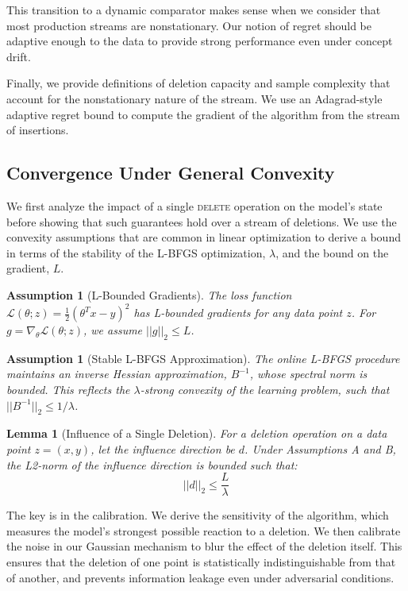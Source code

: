 \documentclass[a4paper,12pt]{article}
\newtheorem{lemma}[theorem]{Lemma}
\newtheorem{assumption}[theorem]{Assumption}
\begin{document}
This transition to a dynamic comparator makes sense when we consider that most production streams are nonstationary. Our notion of regret should be adaptive enough to the data to provide strong performance even under concept drift.

Finally, we provide definitions of deletion capacity and sample complexity that account for the nonstationary nature of the stream. We use an Adagrad-style adaptive regret bound to compute the gradient of the algorithm from the stream of insertions.

\subsection{Convergence Under General Convexity}

We first analyze the impact of a single \textsc{delete} operation on the model's state before showing that such guarantees hold over a stream of deletions. We use the convexity assumptions that are common in linear optimization to derive a bound in terms of the stability of the L-BFGS optimization, $\lambda$, and the bound on the gradient, $L$.

\begin{assumption}[L-Bounded Gradients]
\label{assum:lipschitz}
The loss function $\mathcal{L}(\theta; z) = \frac{1}{2}(\theta^{T} x - y)^2$ has L-bounded gradients for any data point $z$. For $g = \nabla_{\theta} \mathcal{L}(\theta; z)$, we assume $||g||_{2} \leq L$.
\end{assumption}

\begin{assumption}[Stable L-BFGS Approximation]
\label{assum:stable-lbfgs}
The online L-BFGS procedure maintains an inverse Hessian approximation, $B^{-1}$, whose spectral norm is bounded. This reflects the $\lambda$-strong convexity of the learning problem, such that $||B^{-1}||_{2} \leq 1/\lambda$.
\end{assumption}

\begin{lemma}[Influence of a Single Deletion]
\label{lem:bounded-influence}
For a deletion operation on a data point $z=(x, y)$, let the influence direction be $d$. Under Assumptions A and B, the L2-norm of the influence direction is bounded such that:
$$
||d||_{2} \leq \frac{L}{\lambda}
$$
\end{lemma}

The key is in the calibration. We derive the sensitivity of the algorithm, which measures the model's strongest possible reaction to a deletion. We then calibrate the noise in our Gaussian mechanism to blur the effect of the deletion itself. This ensures that the deletion of one point is statistically indistinguishable from that of another, and prevents information leakage even under adversarial conditions.
\end{document}

